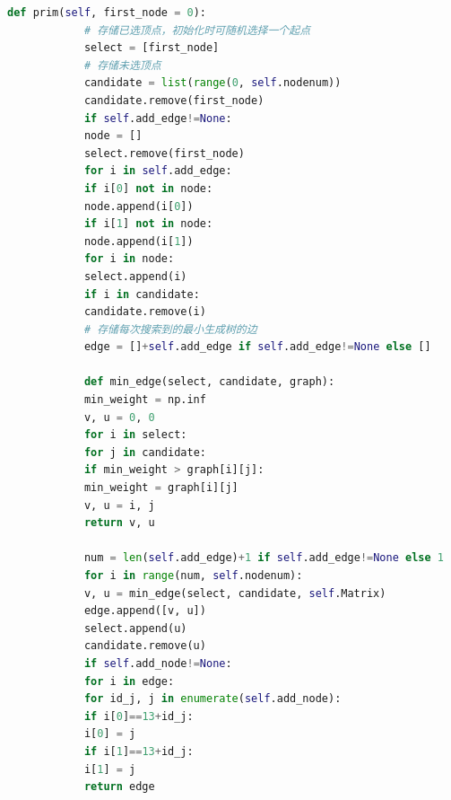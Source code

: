 \documentclass{whutmod}
\begin{document}
\begin{lstlisting}[language=python]
			def prim(self, first_node = 0):
			# 存储已选顶点，初始化时可随机选择一个起点
			select = [first_node]
			# 存储未选顶点
			candidate = list(range(0, self.nodenum))
			candidate.remove(first_node)
			if self.add_edge!=None:
			node = []
			select.remove(first_node)
			for i in self.add_edge:
			if i[0] not in node:
			node.append(i[0])
			if i[1] not in node:
			node.append(i[1]) 
			for i in node:
			select.append(i)
			if i in candidate:
			candidate.remove(i)
			# 存储每次搜索到的最小生成树的边
			edge = []+self.add_edge if self.add_edge!=None else []
			
			def min_edge(select, candidate, graph):
			min_weight = np.inf
			v, u = 0, 0
			for i in select:
			for j in candidate:
			if min_weight > graph[i][j]:
			min_weight = graph[i][j]
			v, u = i, j
			return v, u
			
			num = len(self.add_edge)+1 if self.add_edge!=None else 1
			for i in range(num, self.nodenum):
			v, u = min_edge(select, candidate, self.Matrix)
			edge.append([v, u])
			select.append(u)
			candidate.remove(u)
			if self.add_node!=None:
			for i in edge:
			for id_j, j in enumerate(self.add_node):
			if i[0]==13+id_j:
			i[0] = j
			if i[1]==13+id_j:
			i[1] = j
			return edge
			\end{lstlisting}
			
\end{document}
